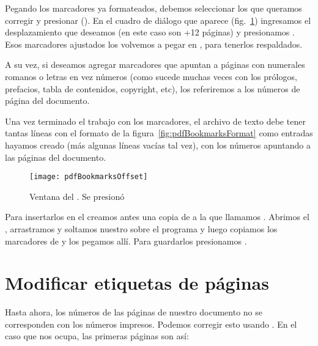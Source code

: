 \documentclass[%
	a5paper,
	10pt,
	twoside,
	openright,
	final,
]{memoir}
\begin{document}
	Pegando los marcadores ya formateados, debemos seleccionar los que queramos corregir y presionar \keys{\boldpm} (). En el cuadro de diálogo que aparece (fig.~\ref{fig:pdfBookmarksOffset}) ingresamos el desplazamiento que deseamos (en este caso son +12 páginas) y presionamos . Esos marcadores ajustados los volvemos a pegar en , para tenerlos respaldados.

	A su vez, si deseamos agregar marcadores que apuntan a páginas con numerales romanos o letras en vez números (como sucede muchas veces con los prólogos, prefacios, tabla de contenidos, copyright, etc), los referiremos a los números de página del documento.

	Una vez terminado el trabajo con los marcadores, el archivo de texto  debe tener tantas líneas con el formato de la figura~\ref{fig:pdfBookmarksFormat} como entradas hayamos creado (más algunas líneas vacías tal vez), con los números apuntando a las páginas del documento.

	\begin{figure}
		\texttt{[image: pdfBookmarksOffset]}
		\caption[Ventana del \pdg.]{Ventana del \pdg. Se presionó \keys{\protect\boldpm}\label{fig:pdfBookmarksOffset}}
	\end{figure}

	Para insertarlos en el \pdf creamos antes una copia de  a la que llamamos . Abrimos el \pdg, arrastramos y soltamos nuestro \pdf sobre el programa y luego copiamos los marcadores de  y los pegamos allí. Para guardarlos presionamos .

	\section{Modificar etiquetas de páginas\label{sec:pdfPageLabels}} Hasta ahora, los números de las páginas de nuestro documento no se corresponden con los números impresos. Podemos corregir esto usando \acrobat. En el caso que nos ocupa, las primeras páginas son así:
\end{document}
